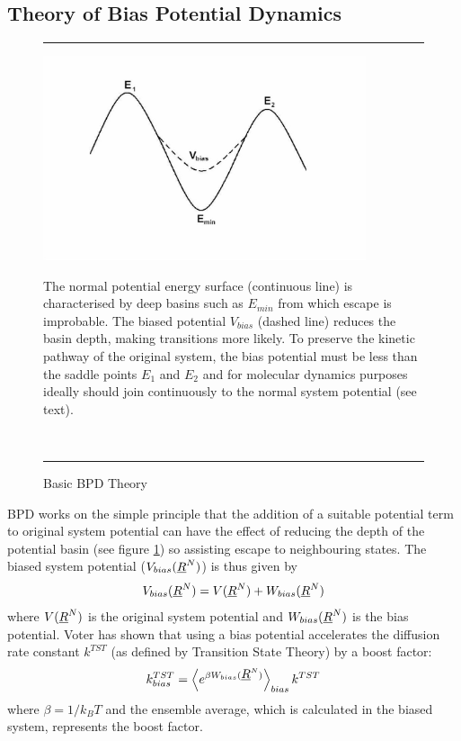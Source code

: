 \subsection{Theory of Bias Potential Dynamics}
\begin{figure}[ht]
\hrule
\vspace{1.0cm}
\begin{center}
\includegraphics[height=6cm]{BiasPot.ps}
\end{center}
\caption{Basic BPD Theory\label{bpdfig}}
The normal potential energy surface (continuous line) is characterised
by deep basins such as $E_{min}$ from which escape is improbable. The
biased potential $V_{bias}$ (dashed line) reduces the basin depth,
making transitions more likely. To preserve the kinetic pathway of the
original system, the bias potential must be less than the saddle
points $E_1$ and $E_2$ and for molecular dynamics purposes ideally should
join continuously to the normal system potential (see text).

~
\hrule
\end{figure}
BPD works on the simple principle that the addition of a suitable
potential term to original system potential can have the effect of
reducing the depth of the potential basin (see figure \ref{bpdfig}) so
assisting escape to neighbouring states. The biased system potential
($V_{bias}(\mbox{$\underline{R}$}^{N})$) is thus given by
\begin{equation}
V_{bias}(\mbox{$\underline{R}$}^{N})=V(\mbox{$\underline{R}$}^{N})+W_{bias}(\mbox{$\underline{R}$}^{N}) \label{sbias}
\end{equation}
where $V(\mbox{$\underline{R}$}^{N})$ is the original system potential and
$W_{bias}(\mbox{$\underline{R}$}^{N})$ is the bias potential.
Voter \cite{voter-97a} has shown that using a bias potential
accelerates the diffusion rate constant $k^{TST}$ (as defined by
Transition State Theory) by a boost factor:
\begin{equation}
 k^{TST}_{bias}=\left <e^{\beta W_{bias}(\mbox{$\underline{R}$}^{N})}\right
 >_{bias} k^{TST} \label{boost}
\end{equation}
where $\beta=1/k_BT$ and the ensemble average, which is calculated in the
biased system, represents the boost factor.

